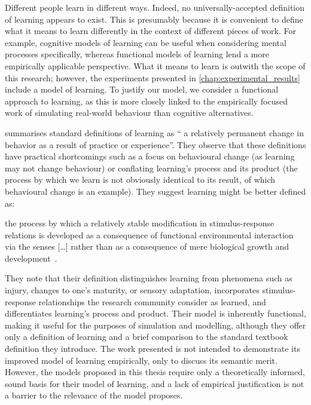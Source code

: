 Different people learn in different ways. Indeed, no universally-accepted
definition of learning appears to exist. This is presumably because it is
convenient to define what it means to learn differently in the context of
different pieces of work. For example, cognitive models of learning can be
useful when considering mental processes specifically, whereas functional models
of learning lend a more empirically applicable perspective. What it means to
learn is outwith the scope of this research; however, the experiments presented
in \cref{chap:experimental_results} include a model of learning. To justify our
model, we consider a functional approach to learning, as this is more closely
linked to the empirically focused work of simulating real-world behaviour than
cognitive alternatives.

\citet{lachman1997learning} summarises standard definitions of learning as
``\textelp{} a relatively permanent change in behavior as a result of practice
or experience''. They observe that these definitions have practical shortcomings
such as a focus on behavioural change (as learning may not change behaviour) or
conflating learning's process and its product (the process by which we learn is
not obviously identical to its result, of which behavioural change is an
example). They suggest learning might be better defined as:

\begin{displayquote}
\textelp{} the process by which a relatively stable modification in
stimulus-response relations is developed as a consequence of functional
environmental interaction via the senses [\ldots{}] rather than as a consequence
of mere biological growth and development~\cite{lachman1997learning}.
\end{displayquote}

They note that their definition distinguishes learning from phenomena such as
injury, changes to one's maturity, or sensory adaptation, incorporates
stimulus-response relationships the research community consider as learned, and
differentiates learning's process and product. Their model is inherently
functional, making it useful for the purposes of simulation and modelling,
although they offer only a definition of learning and a brief comparison to
the standard textbook definition they introduce. The work presented is not
intended to demonstrate its improved model of learning empirically, only to
discuss its semantic merit. However, the models proposed in this thesis require
only a theoretically informed, sound basis for their model of learning, and a
lack of empirical justification is not a barrier to the relevance of the model
\citeauthor{lachman1997learning} proposes.

